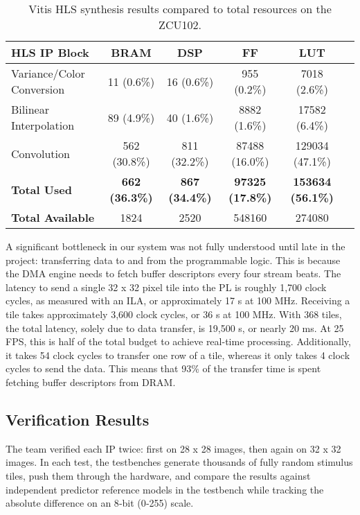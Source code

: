 \documentclass{article}
\begin{document}
    \begin{table}[h]
    \centering
    \caption{Vitis HLS synthesis results compared to total resources on the ZCU102.}
    \label{tab:hls_resources}
    \begin{tabular}{|l|c|c|c|c|c|}
    \hline
    \textbf{HLS IP Block} & \textbf{BRAM} & \textbf{DSP} & \textbf{FF} & \textbf{LUT} \\
    \hline
    Variance/Color Conversion & 11 (0.6\%) & 16 (0.6\%) & 955 (0.2\%) & 7018 (2.6\%) \\
    Bilinear Interpolation     & 89 (4.9\%) & 40 (1.6\%) & 8882 (1.6\%) & 17582 (6.4\%) \\
    Convolution                & 562 (30.8\%) & 811 (32.2\%) & 87488 (16.0\%) & 129034 (47.1\%) \\
    \hline
    \textbf{Total Used}        & \textbf{662 (36.3\%)} & \textbf{867 (34.4\%)} & \textbf{97325 (17.8\%)} & \textbf{153634 (56.1\%)} \\
    \textbf{Total Available}   & 1824 & 2520 & 548160 & 274080 \\
    \hline
    \end{tabular}
    \end{table}

    \par A significant bottleneck in our system was not fully understood until late in the project: transferring data to and from the programmable logic. This is because the DMA engine needs to fetch buffer descriptors every four stream beats. The latency to send a single 32 x 32 pixel tile into the PL is roughly 1,700 clock cycles, as measured with an ILA, or approximately 17 \textmu s at 100 MHz. Receiving a tile takes approximately 3,600 clock cycles, or 36 \textmu s at 100 MHz. With 368 tiles, the total latency, solely due to data transfer, is 19,500 \textmu s, or nearly 20 ms. At 25 FPS, this is half of the total budget to achieve real-time processing. Additionally, it takes 54 clock cycles to transfer one row of a tile, whereas it only takes 4 clock cycles to send the data. This means that 93\% of the transfer time is spent fetching buffer descriptors from DRAM.


    \subsection{Verification Results}
    \noindent The team verified each IP twice: first on 28 x 28 images, then again on 32 x 32 images. In each test, the testbenches generate thousands of fully random stimulus tiles, push them through the hardware, and compare the results against independent predictor reference models in the testbench while tracking the absolute difference on an 8‑bit (0‑255) scale.
\end{document}
